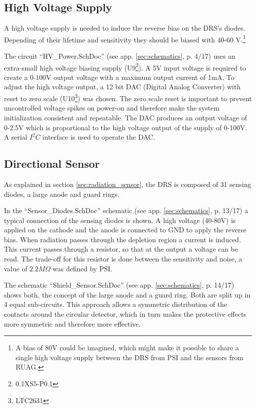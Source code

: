 \subsection{High Voltage Supply}
\label{sec:hv_supply}
A high voltage supply is needed to induce the reverse bias on the DRS's diodes.
Depending of their lifetime and sensitivity they should be biased with 40-60 V.\footnote{A bias of 80V could be imagined, which might make it possible to share a single high voltage supply between the DRS from PSI and the sensors from RUAG.} 

The circuit ``HV\_Power.SchDoc'' (see app. \ref{sec:schematics}, p. 4/17) uses an extra-small high voltage biasing supply (U9\footnote{0.1XS5-P0.1}).
A 5V input voltage is required to create a 0-100V output voltage with a maximum output current of 1mA.
To adjust the high voltage output, a 12 bit DAC (Digital Analog Converter) with reset to zero scale (U10\footnote{LTC2631}) was chosen.
The zero scale reset is important to prevent uncontrolled voltage spikes on power-on and therefore make the system initialization consistent and repeatable.
The DAC produces an output voltage of 0-2.5V which is proportional to the high voltage output of the supply of 0-100V.
A serial $I^2C$ interface is used to operate the DAC.

\subsection{Directional Sensor}
\label{sec:directionality Sensor}
As explained in section \ref{sec:radiation_sensor}, the DRS is composed of 31 sensing diodes, a large anode and guard rings.

In the ``Sensor\_Diodes.SchDoc'' schematic (see app. \ref{sec:schematics}, p. 13/17) a typical connection of the sensing diodes is shown.
A high voltage (40-80V) is applied on the cathode and the anode is connected to GND to apply the reverse bias.
When radiation passes through the depletion region a current is induced.
This current passes through a resistor, so that at the output a voltage can be read.
The trade-off for this resistor is done between the sensitivity and noise, a value of $2.2M\Omega$ was defined by PSI.

The schematic ``Shield\_Sensor.SchDoc'' (see app. \ref{sec:schematics}, p. 14/17) shows both, the concept of the large anode and a guard ring.
Both are split up in 4 equal sub-circuits.
This approach allows a symmetric distribution of the contacts around the circular detector, which in turn makes the protective effects more symmetric and therefore more effective. 

